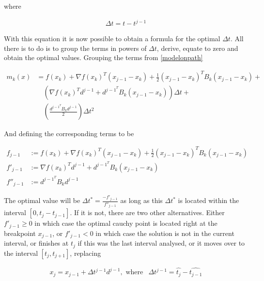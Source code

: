 where

\begin{equation*}
  \begin{aligned}
    \Delta t = t - t^{j-1}
  \end{aligned}
\end{equation*}

With this equation it is now possible to obtain a formula for the optimal $\Delta t$. All there is to do is to group the terms in powers of $\Delta t$, derive, equate to zero and obtain the optimal values. Grouping the terms from \ref{modelonpath}

\begin{equation} \label{cauchyterms}
  \begin{aligned}
    m_k(x) & = f(x_k) + \nabla f(x_k)^T ( x_{j-1} - x_k) + 
    \frac{1}{2} ( x_{j-1} - x_k)^T B_k ( x_{j-1} - x_k) + \\
    & \quad \left( \nabla f(x_k)^T d^{j-1} + d^{{j-1}^T} B_k (x_{j-1} - x_k) 
    \right) \Delta t + \\
    & \quad \left( \frac{d^{{j-1}^T} B_k d^{j-1}}{2} \right) \Delta t^2
  \end{aligned}
\end{equation}

And defining the corresponding terms to be

\begin{align} \label{cauchydefinitions}
  f_{j-1} & := f(x_k) + \nabla f(x_k)^T ( x_{j-1} - x_k) + \frac{1}{2} ( x_{j-1} - x_k)^T B_k ( x_{j-1} - x_k) \\
  f'_{j-1} & := \nabla f(x_k)^T d^{j-1} + d^{{j-1}^T} B_k (x_{j-1} - x_k) \\
  f''_{j-1} & := d^{{j-1}^T} B_k d^{j-1}
\end{align}

The optimal value will be $\Delta t^* = \frac{-f'_{j-1}}{f''_{j-1}}$ as long as this $\Delta t^*$ is located within the interval $[0, t_j - t_{j-1}]$. If it is not, there are two other alternatives. Either $f'_{j-1} \geq 0$ in which case the optimal cauchy point is located right at the breakpoint $x_{j-1}$, or $f'_{j-1} < 0$ in which case the solution is not in the current interval, or finishes at $t_j$ if this was the last interval analysed, or it moves over to the interval $[t_j, t_{j+1}]$, replacing

\begin{align}
  x_j = x_{j-1} + \Delta t^{j-1} d^{j-1}, \text{ where} & 
  \Delta t^{j-1} = \hat{t_j} - \hat{t_{j-1}}
\end{align}

